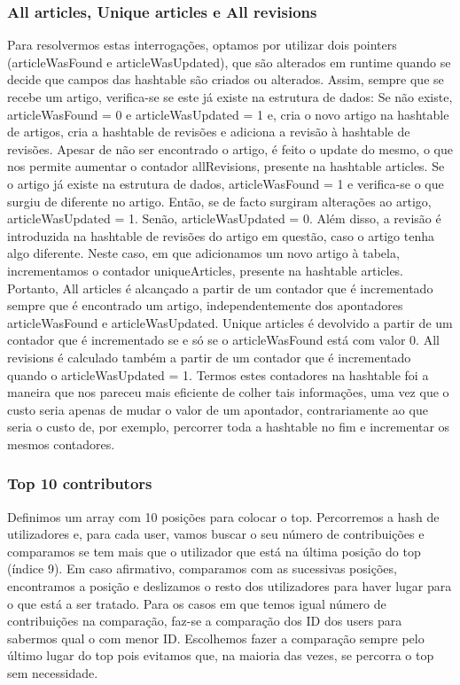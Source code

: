 \documentclass[a4paper]{article}
\begin{document}
\subsubsection{All articles, Unique articles e All revisions}
Para resolvermos estas interrogações, optamos por utilizar dois pointers (articleWasFound e articleWasUpdated), que são alterados em runtime quando se decide que campos das hashtable são criados ou alterados.
Assim, sempre que se recebe um artigo, verifica-se se este já existe na estrutura de dados:
Se não existe, articleWasFound = 0 e articleWasUpdated = 1 e, cria o novo artigo na hashtable de artigos, cria a hashtable de revisões e adiciona a revisão à hashtable de revisões. Apesar de não ser encontrado o artigo, é feito o update do mesmo, o que nos permite aumentar o contador allRevisions, presente na hashtable articles.
Se o artigo já existe na estrutura de dados, articleWasFound = 1 e verifica-se o que surgiu de diferente no artigo. Então, se de facto surgiram alterações ao artigo, articleWasUpdated = 1. Senão, articleWasUpdated = 0. Além disso, a revisão é introduzida na hashtable de revisões do artigo em questão, caso o artigo tenha algo diferente. Neste caso, em que adicionamos um novo artigo à tabela, incrementamos o contador uniqueArticles, presente na hashtable articles.
Portanto, All articles é alcançado a partir de um contador que é incrementado sempre que é encontrado um artigo, independentemente dos apontadores articleWasFound e articleWasUpdated. Unique articles é devolvido a partir de um contador que é incrementado se e só se o articleWasFound está com valor 0. All revisions é calculado também a partir de um contador que é incrementado quando o articleWasUpdated = 1.
Termos estes contadores na hashtable foi a maneira que nos pareceu mais eficiente de colher tais informações, uma vez que o custo seria apenas de mudar o valor de um apontador, contrariamente ao que seria o custo de, por exemplo, percorrer toda a hashtable no fim e incrementar os mesmos contadores.

\subsubsection{Top 10 contributors}
Definimos um array com 10 posições para colocar o top. Percorremos a hash de utilizadores e, para cada user, vamos buscar o seu número de contribuições e comparamos se tem mais que o utilizador que está na última posição do top (índice 9). Em caso afirmativo, comparamos com as sucessivas posições, encontramos a posição e deslizamos o resto dos utilizadores para haver lugar para o que está a ser tratado. Para os casos em que temos igual número de contribuições na comparação, faz-se a comparação dos ID dos users para sabermos qual o com menor ID.
Escolhemos fazer a comparação sempre pelo último lugar do top pois evitamos que, na maioria das vezes, se percorra o top sem necessidade.
\end{document}
